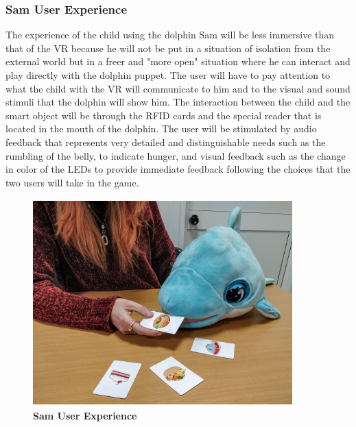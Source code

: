 \documentclass [12pt]{article}
\begin{document}
\subsubsection{Sam User Experience}
The experience of the child using the dolphin Sam will be less immersive than that of the VR because he will not be put in a situation of isolation from the external world but in a freer and "more open" situation where he can interact and play directly with the dolphin puppet. The user will have to pay attention to what the child with the VR will communicate to him and to the visual and sound stimuli that the dolphin will show him. The interaction between the child and the smart object will be through the RFID cards and the special reader that is located in the mouth of the dolphin. The user will be stimulated by audio feedback that represents very detailed and distinguishable needs such as the rumbling of the belly, to indicate hunger, and visual feedback such as the change in color of the LEDs to provide immediate feedback following the choices that the two users will take in the game.
\begin{figure}[ht!]
\centering
\includegraphics[height=8cm,width=10cm]{SamUserExperience.jpg}
\caption{\textbf{Sam User Experience}}
\end{figure}
\end{document}

